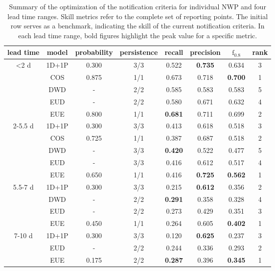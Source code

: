 \documentclass[preprint,12pt]{elsarticle}
\begin{document}
\begin{table}
    \centering
    \caption{Summary of the optimization of the notification criteria for individual NWP and four lead time ranges. Skill metrics refer to the complete set of reporting points.  The initial row serves as a benchmark, indicating the skill of the current notification criteria. In each lead time range, bold figures highlight the peak value for a specific metric.}
    \footnotesize
    \begin{tabular}{cccccccc}
        \toprule
        lead time & model & probability & persistence & recall & precision & $\text{f}_{0.8}$ & rank \\
        \midrule
        \textless 2 d & 1D+1P & 0.300& 3/3 & 0.522 & \textbf{0.735} & 0.634 & 3 \\
         & COS & 0.875 & 1/1 & 0.673 & 0.718 & \textbf{0.700} & 1 \\
         & DWD & - & 2/2 & 0.585 & 0.583 & 0.583 & 5 \\
         & EUD & - & 2/2 & 0.580 & 0.671 & 0.632 & 4 \\
         & EUE & 0.800 & 1/1 & \textbf{0.681} & 0.711 & 0.699 & 2 \\
         \midrule
        2-5.5 d & 1D+1P & 0.300& 3/3 & 0.413 & 0.618 & 0.518 & 3 \\
         & COS & 0.725 & 1/1 & 0.387 & 0.687 & 0.518 & 2 \\
         & DWD & - & 3/3 & \textbf{0.420} & 0.522 & 0.477 & 5 \\
         & EUD & - & 3/3 & 0.416 & 0.612 & 0.517 & 4 \\
         & EUE & 0.650 & 1/1 & 0.416 & \textbf{0.725} & \textbf{0.562} & 1 \\
         \midrule
        5.5-7 d & 1D+1P & 0.300& 3/3 & 0.215 & \textbf{0.612} & 0.356 & 2 \\
         & DWD & - & 2/2 & \textbf{0.291} & 0.358 & 0.328 & 4 \\
         & EUD & - & 2/2 & 0.273 & 0.429 & 0.351 & 3 \\
         & EUE & 0.450 & 1/1 & 0.264 & 0.605 & \textbf{0.402} & 1 \\
         \midrule
        7-10 d & 1D+1P & 0.300& 3/3 & 0.120 & \textbf{0.625} & 0.237 & 3 \\
         & EUD & - & 2/2 & 0.244 & 0.336 & 0.293 & 2 \\
         & EUE & 0.175 & 2/2 & \textbf{0.287} & 0.396 & \textbf{0.345} & 1 \\
         \bottomrule
    \end{tabular}
    \label{tab:NWP_optimization}
\end{table}
\end{document}
